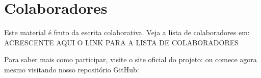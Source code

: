 
\chapter*{Colaboradores}\label{colaboradores}
\iflatexml\else{}\fi

Este material é fruto da escrita colaborativa. Veja a lista de colaboradores em: 
ACRESCENTE AQUI O LINK PARA A LISTA DE COLABORADORES 

Para saber mais como participar, visite o site oficial do projeto:
ou comece agora mesmo visitando nosso repositório GitHub:

